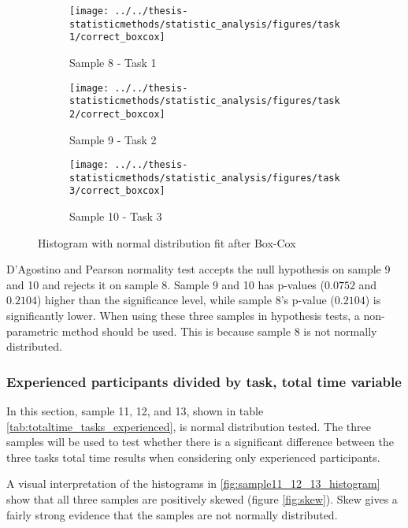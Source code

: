 \begin{figure}[h!]
	\centering
	\begin{subfigure}[b]{0.3\textwidth}
		\centering
		\texttt{[image: ../../thesis-statisticmethods/statistic\_analysis/figures/task1/correct\_boxcox]}
		\caption{Sample 8 - Task 1}
		\label{fig:correctboxcox_task1}
	\end{subfigure}
	\begin{subfigure}[b]{0.3\textwidth}
		\centering
		\texttt{[image: ../../thesis-statisticmethods/statistic\_analysis/figures/task2/correct\_boxcox]}
		\caption{Sample 9 - Task 2}
		\label{fig:correctboxcox_task2}
	\end{subfigure}
	\begin{subfigure}[b]{0.3\textwidth}
		\centering
		\texttt{[image: ../../thesis-statisticmethods/statistic\_analysis/figures/task3/correct\_boxcox]}
		\caption{Sample 10 - Task 3}
		\label{fig:correctboxcox_task3}
	\end{subfigure}
	\caption{Histogram with normal distribution fit after Box-Cox}
\end{figure}

D'Agostino and Pearson normality test accepts the null hypothesis on sample 9 and 10 and rejects it on sample 8. Sample 9 and 10 has p-values ($0.0752$ and$0.2104$) higher than the significance level, while sample 8's p-value ($0.2104$) is significantly lower. When using these three samples in hypothesis tests, a non-parametric method should be used. This is because sample 8 is not normally distributed. 

\subsubsection[Sample 11, 12 and 13]{Experienced participants divided by task, total time variable}
In this section, sample 11, 12, and 13, shown in table \ref{tab:totaltime_tasks_experienced}, is normal distribution tested. The three samples will be used to test whether there is a significant difference between the three tasks total time results when considering only experienced participants. 

A visual interpretation of the histograms in \ref{fig:sample11_12_13_histogram} show that all three samples are positively skewed (figure \ref{fig:skew}). Skew gives a fairly strong evidence that the samples are not normally distributed.

